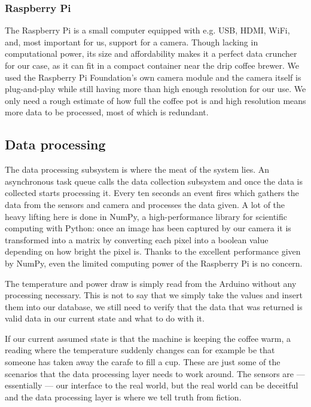 \documentclass[12pt,a4paper,oneside,article]{memoir}
\numberwithin{equation}{chapter}
\begin{document}
\subsubsection{Raspberry Pi}\label{sec:raspberry-pi}
The Raspberry Pi is a small computer equipped with e.g. USB, HDMI, WiFi, 
and, most important for us, support for a camera. Though lacking in 
computational power, its size and affordability makes it a perfect data 
cruncher for our case, as it can fit in a compact container near the drip 
coffee brewer. We used the Raspberry Pi Foundation's own camera module and the 
camera itself is plug-and-play while still having more than high enough 
resolution for our use. We only need a rough estimate of how full the coffee pot 
is and high resolution means more data to be processed, most of which is 
redundant.

\subsection{Data processing}\label{sec:data-processing}
The data processing subsystem is where the meat of the system lies. An 
asynchronous task queue calls the data collection subsystem and once the data is
collected starts processing it. Every ten seconds an event fires which gathers
the data from the sensors and camera and processes the data given. A lot of the
heavy lifting here is done in NumPy, a high-performance library for scientific
computing with Python: once an image has been captured by our camera it is
transformed into a matrix by converting each pixel into a boolean value
depending on how bright the pixel is. Thanks to the excellent performance given
by NumPy, even the limited computing power of the Raspberry Pi is no concern.

The temperature and power draw is simply read from the Arduino without any
processing necessary. This is not to say that we simply take the values and
insert them into our database, we still need to verify that the data that was
returned is valid data in our current state and what to do with it.

If our current assumed state is that the machine is keeping the coffee warm, a
reading where the temperature suddenly changes can for example be that someone
has taken away the carafe to fill a cup. These are just some of the scenarios
that the data processing layer needs to work around. The sensors are ---
essentially --- our interface to the real world, but the real world can be
deceitful and the data processing layer is where we tell truth from fiction.
\end{document}
